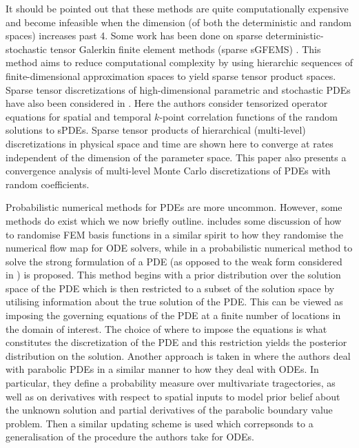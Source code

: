 It should be pointed out that these methods are quite computationally expensive and become infeasible when the dimension (of both the deterministic and random spaces) increases past 4. Some work has been done on sparse deterministic-stochastic tensor Galerkin finite element methods (sparse sGFEMS) \textcolor{blue}{\citep{bieri2010sparse}}. This method aims to reduce computational complexity by using hierarchic sequences of finite-dimensional approximation spaces to yield sparse tensor product spaces. Sparse tensor discretizations of high-dimensional parametric and stochastic PDEs have also been considered in \textcolor{blue}{\citep{schwab2011sparse}}. Here the authors consider tensorized operator equations for spatial and temporal $k$-point correlation functions of the random solutions to sPDEs. Sparse tensor products of hierarchical (multi-level) discretizations in physical space and time are shown here to converge at rates independent of the dimension of the parameter space. This paper also presents a convergence analysis of multi-level Monte Carlo discretizations of PDEs with random coefficients.

Probabilistic numerical methods for PDEs are more uncommon. However, some methods do exist which we now briefly outline. \textcolor{blue}{\citep{conrad2017statistical}} includes some discussion of how to randomise FEM basis functions in a similar spirit to how they randomise the numerical flow map for ODE solvers, while in \textcolor{blue}{\citep{cockayne2016probabilistic}} a probabilistic numerical method to solve the strong formulation of a PDE (as opposed to the weak form considered in \textcolor{blue}{\citep{conrad2017statistical}}) is proposed. This method begins with a prior distribution over the solution space of the PDE which is then restricted to a subset of the solution space by utilising information about the true solution of the PDE. This can be viewed as imposing the governing equations of the PDE at a finite number of locations in the domain of interest. The choice of where to impose the equations is what constitutes the discretization of the PDE and this restriction yields the posterior distribution on the solution. Another approach is taken in \textcolor{blue}{\citep{chkrebtii2016bayesian}} where the authors deal with parabolic PDEs in a similar manner to how they deal with ODEs. In particular, they define a probability measure over multivariate tragectories, as well as on derivatives with respect to spatial inputs to model prior belief about the unknown solution and partial derivatives of the parabolic boundary value problem. Then a similar updating scheme is used which correpsonds to a generalisation of the procedure the authors take for ODEs.

